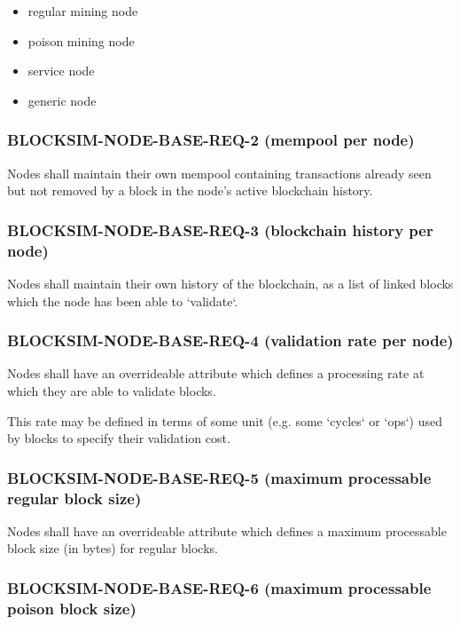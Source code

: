 \documentclass{scrreprt}
\begin{document}
        \begin{itemize}
          \item regular mining node
          \item poison mining node
          \item service node
          \item generic node
        \end{itemize}

      \subsubsection{BLOCKSIM-NODE-BASE-REQ-2 (mempool per node)}

        Nodes shall maintain their own mempool containing transactions already
        seen but not removed by a block in the node's active blockchain history.

      \subsubsection{BLOCKSIM-NODE-BASE-REQ-3 (blockchain history per node)}

        Nodes shall maintain their own history of the blockchain, as a list of
        linked blocks which the node has been able to `validate`.

      \subsubsection{BLOCKSIM-NODE-BASE-REQ-4 (validation rate per node)}

        Nodes shall have an overrideable attribute which defines a processing
        rate at which they are able to validate blocks.

        This rate may be defined in terms of some unit (e.g. some `cycles` or
        `ops`) used by blocks to specify their validation cost.

      \subsubsection{BLOCKSIM-NODE-BASE-REQ-5 (maximum processable regular block size)}

        Nodes shall have an overrideable attribute which defines a maximum
        processable block size (in bytes) for regular blocks.

      \subsubsection{BLOCKSIM-NODE-BASE-REQ-6 (maximum processable poison block size)}
\end{document}
